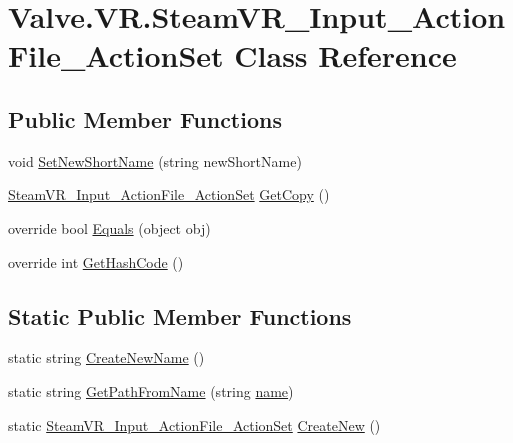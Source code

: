 \hypertarget{class_valve_1_1_v_r_1_1_steam_v_r___input___action_file___action_set}{}\section{Valve.\+V\+R.\+Steam\+V\+R\+\_\+\+Input\+\_\+\+Action\+File\+\_\+\+Action\+Set Class Reference}
\label{class_valve_1_1_v_r_1_1_steam_v_r___input___action_file___action_set}
\subsection*{Public Member Functions}
\begin{DoxyCompactItemize}
\item 
void \mbox{\hyperlink{class_valve_1_1_v_r_1_1_steam_v_r___input___action_file___action_set_a18da1109fbd946c4f52f9a0c15c43083}{Set\+New\+Short\+Name}} (string new\+Short\+Name)
\item 
\mbox{\hyperlink{class_valve_1_1_v_r_1_1_steam_v_r___input___action_file___action_set}{Steam\+V\+R\+\_\+\+Input\+\_\+\+Action\+File\+\_\+\+Action\+Set}} \mbox{\hyperlink{class_valve_1_1_v_r_1_1_steam_v_r___input___action_file___action_set_aff6ac32c01750e5e418839244c9204a1}{Get\+Copy}} ()
\item 
override bool \mbox{\hyperlink{class_valve_1_1_v_r_1_1_steam_v_r___input___action_file___action_set_a27625a392b7fe2a7b6d59ee0f446a826}{Equals}} (object obj)
\item 
override int \mbox{\hyperlink{class_valve_1_1_v_r_1_1_steam_v_r___input___action_file___action_set_a1099d3f61e6b2bd56c161810a2e533a3}{Get\+Hash\+Code}} ()
\end{DoxyCompactItemize}
\subsection*{Static Public Member Functions}
\begin{DoxyCompactItemize}
\item 
static string \mbox{\hyperlink{class_valve_1_1_v_r_1_1_steam_v_r___input___action_file___action_set_abb5255d6d7a8c328e3f7e6f852f0632f}{Create\+New\+Name}} ()
\item 
static string \mbox{\hyperlink{class_valve_1_1_v_r_1_1_steam_v_r___input___action_file___action_set_ad97f7f8622476c472bea5850a2d2f276}{Get\+Path\+From\+Name}} (string \mbox{\hyperlink{class_valve_1_1_v_r_1_1_steam_v_r___input___action_file___action_set_ae074781c069d0f0b46dfd815857dbd9c}{name}})
\item 
static \mbox{\hyperlink{class_valve_1_1_v_r_1_1_steam_v_r___input___action_file___action_set}{Steam\+V\+R\+\_\+\+Input\+\_\+\+Action\+File\+\_\+\+Action\+Set}} \mbox{\hyperlink{class_valve_1_1_v_r_1_1_steam_v_r___input___action_file___action_set_aef67dbd15882c2ecbf71b580ab561063}{Create\+New}} ()
\end{DoxyCompactItemize}
